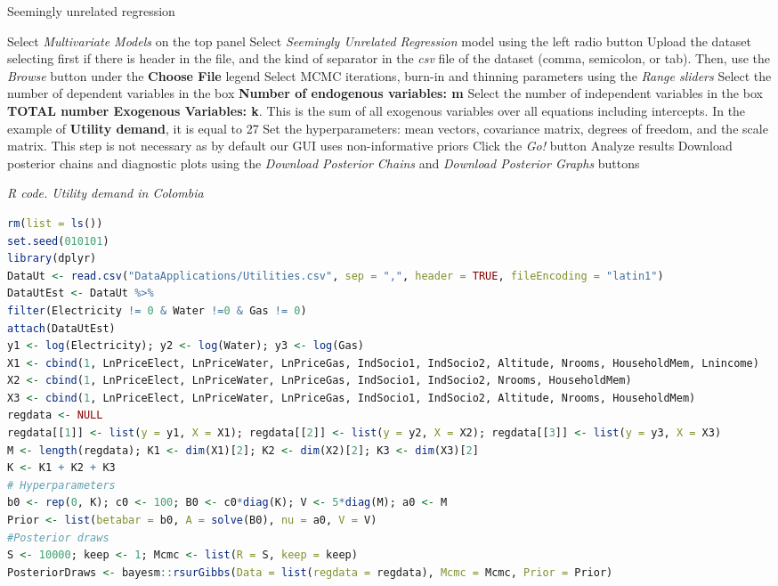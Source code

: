 \begin{algorithm}[h!]
	\caption{Seemingly unrelated regression}\label{alg:SUR}
	\begin{algorithmic}[1]  		 			
		\State Select \textit{Multivariate Models} on the top panel
		\State Select \textit{Seemingly Unrelated Regression} model using the left radio button
		\State Upload the dataset selecting first if there is header in the file, and the kind of separator in the \textit{csv} file of the dataset (comma, semicolon, or tab). Then, use the \textit{Browse} button under the \textbf{Choose File} legend
		\State Select MCMC iterations, burn-in and thinning parameters using the \textit{Range sliders}
		\State Select the number of dependent variables in the box \textbf{Number of endogenous variables: m}
		\State Select the number of independent variables in the box \textbf{TOTAL number Exogenous Variables: k}. This is the sum of all exogenous variables over all equations including intercepts. In the example of \textbf{Utility demand}, it is equal to 27
		\State Set the hyperparameters: mean vectors, covariance matrix, degrees of freedom, and the scale matrix. This step is not necessary as by default our GUI uses non-informative priors
		\State Click the \textit{Go!} button
		\State Analyze results
		\State Download posterior chains and diagnostic plots using the \textit{Download Posterior Chains} and \textit{Download Posterior Graphs} buttons
	\end{algorithmic} 
\end{algorithm}


\begin{tcolorbox}[enhanced,width=4.67in,center upper,
	fontupper=\large\bfseries,drop shadow southwest,sharp corners]
	\textit{R code. Utility demand in Colombia}
	\begin{VF}
		\begin{lstlisting}[language=R]
rm(list = ls())
set.seed(010101)
library(dplyr)
DataUt <- read.csv("DataApplications/Utilities.csv", sep = ",", header = TRUE, fileEncoding = "latin1")
DataUtEst <- DataUt %>%  
filter(Electricity != 0 & Water !=0 & Gas != 0)
attach(DataUtEst)
y1 <- log(Electricity); y2 <- log(Water); y3 <- log(Gas)
X1 <- cbind(1, LnPriceElect, LnPriceWater, LnPriceGas, IndSocio1, IndSocio2, Altitude, Nrooms, HouseholdMem, Lnincome)
X2 <- cbind(1, LnPriceElect, LnPriceWater, LnPriceGas, IndSocio1, IndSocio2, Nrooms, HouseholdMem)
X3 <- cbind(1, LnPriceElect, LnPriceWater, LnPriceGas, IndSocio1, IndSocio2, Altitude, Nrooms, HouseholdMem)
regdata <- NULL
regdata[[1]] <- list(y = y1, X = X1); regdata[[2]] <- list(y = y2, X = X2); regdata[[3]] <- list(y = y3, X = X3)
M <- length(regdata); K1 <- dim(X1)[2]; K2 <- dim(X2)[2]; K3 <- dim(X3)[2] 
K <- K1 + K2 + K3
# Hyperparameters
b0 <- rep(0, K); c0 <- 100; B0 <- c0*diag(K); V <- 5*diag(M); a0 <- M
Prior <- list(betabar = b0, A = solve(B0), nu = a0, V = V)
#Posterior draws
S <- 10000; keep <- 1; Mcmc <- list(R = S, keep = keep)
PosteriorDraws <- bayesm::rsurGibbs(Data = list(regdata = regdata), Mcmc = Mcmc, Prior = Prior)
\end{lstlisting}
	\end{VF}
\end{tcolorbox}

